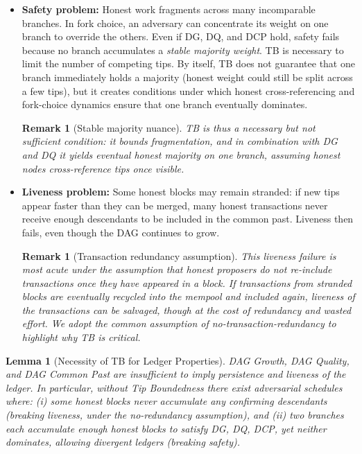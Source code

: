 \documentclass[11pt]{article}
\newtheorem{remark}[theorem]{Remark}
\newtheorem{lemma}[theorem]{Lemma}
\begin{document}
\begin{itemize}
  \item \textbf{Safety problem:} Honest work fragments across many incomparable
  branches. In fork choice, an adversary can concentrate its weight on one branch
  to override the others. Even if DG, DQ, and DCP hold, safety fails because no
  branch accumulates a \emph{stable majority weight}. TB is necessary to limit
  the number of competing tips. By itself, TB does not guarantee that one branch
  immediately holds a majority (honest weight could still be split across a few
  tips), but it creates conditions under which honest cross-referencing and
  fork-choice dynamics ensure that one branch eventually dominates.
  \begin{remark}[Stable majority nuance]
  TB is thus a \emph{necessary but not sufficient} condition: it bounds
  fragmentation, and in combination with DG and DQ it yields eventual honest
  majority on one branch, assuming honest nodes cross-reference tips once visible.
  \end{remark}

  \item \textbf{Liveness problem:} Some honest blocks may remain stranded: if new
  tips appear faster than they can be merged, many honest transactions never
  receive enough descendants to be included in the common past. Liveness then
  fails, even though the DAG continues to grow.
  \begin{remark}[Transaction redundancy assumption]
  This liveness failure is most acute under the assumption that honest proposers
  do not re-include transactions once they have appeared in a block. If
  transactions from stranded blocks are eventually recycled into the mempool and
  included again, liveness of the \emph{transactions} can be salvaged, though at
  the cost of redundancy and wasted effort. We adopt the common assumption of
  no-transaction-redundancy to highlight why TB is critical.
  \end{remark}
\end{itemize}




\begin{lemma}[Necessity of TB for Ledger Properties]
DAG Growth, DAG Quality, and DAG Common Past are insufficient to imply persistence
and liveness of the ledger. In particular, without Tip Boundedness there exist
adversarial schedules where: (i) some honest blocks never accumulate any confirming
descendants (breaking liveness, under the no-redundancy assumption), and (ii) two
branches each accumulate enough honest blocks to satisfy DG, DQ, DCP, yet neither
dominates, allowing divergent ledgers (breaking safety).
\end{lemma}
\end{document}
